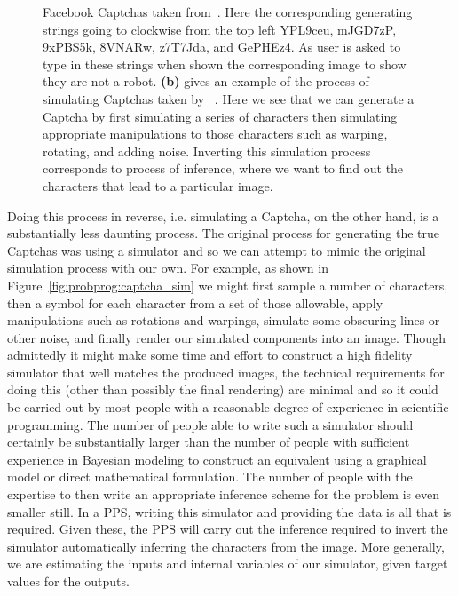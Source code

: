\begin{figure}[t]
{		Facebook Captchas taken from~\cite{le2017using}.  Here the corresponding
		generating strings going
		to clockwise from the top left YPL9ceu, mJGD7zP, 9xPBS5k, 8VNARw, z7T7Jda, and
		GePHEz4.  As user is asked to type in these strings when shown the corresponding
		image to show they are not a robot.
		\textbf{(b)} gives an example of the process of simulating Captchas taken by
		~\cite{le2017inference}.  Here we see that we can generate a Captcha by first
		simulating a series of characters then simulating appropriate manipulations 
		to those characters such as warping, rotating, and adding noise.  Inverting this
		simulation process corresponds to process of inference, where we want to find
		out the characters that lead to a particular image.
		\label{fig:probprog:captcha}}
\end{figure}

Doing this process in reverse, i.e. simulating a Captcha, on the other hand, is a substantially
less daunting process.  The original process for generating the true Captchas was using
a simulator and so we can attempt to mimic the original simulation process with our own.
For example, as shown in Figure~\ref{fig:probprog:captcha_sim} we might first sample a 
number of characters, then a symbol for each character
from a set of those allowable, apply manipulations such as rotations and warpings, simulate
some obscuring lines or other noise, and finally render our simulated components into an
image.  Though admittedly it might make some time and effort to construct a high fidelity
simulator that well matches the produced images, the technical requirements for doing this
(other than possibly the final rendering) are minimal and so it could be carried out by most
people with a reasonable degree of experience in scientific programming.  The number of
people able to write such a simulator should certainly be substantially larger than the
number of people with sufficient experience in Bayesian modeling to construct an equivalent
using a graphical model or direct mathematical formulation.  The number of people
with the expertise to then write an appropriate inference scheme for the problem is even
smaller still.  In a PPS, writing this simulator and providing the data is all that is required.
Given these, the PPS will carry out the inference required to invert the simulator automatically
inferring the characters from the image.  More generally, we are estimating the inputs and
internal variables of our simulator, given target values for the outputs.



